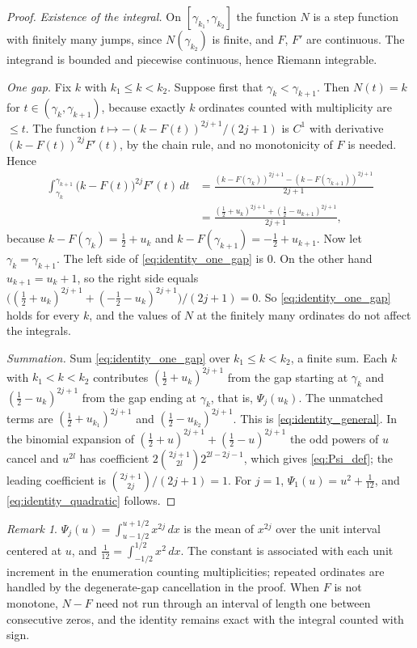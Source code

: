 \documentclass[11pt,a4paper]{article}
\makeatletter
\numberwithin{equation}{section}
\DeclareRobustCommand{\CGeqref}[1]{\eqref{#1}}
\let\CG@origeqref\eqref
\newcommand{\CG@gettip}[1]{\@ifundefined{CGTip@#1}{#1}{\csname CGTip@#1\endcsname}}
\DeclareRobustCommand{\CGeqref}[1]{\pdftooltip{\CG@origeqref{#1}}{\CG@gettip{#1}}}
\theoremstyle{definition}
\theoremstyle{remark}
\newtheorem{remark}[theorem]{Remark}
\makeatother
\begin{document}
\begin{proof}
\emph{Existence of the integral.} On $[\gamma_{k_1},\gamma_{k_2}]$ the function $N$ is a step function with finitely many jumps, since $N(\gamma_{k_2})$ is finite, and $F$, $F'$ are continuous. The integrand is bounded and piecewise continuous, hence Riemann integrable.

\emph{One gap.} Fix $k$ with $k_1\le k<k_2$. Suppose first that $\gamma_k<\gamma_{k+1}$. Then $N(t)=k$ for $t\in(\gamma_k,\gamma_{k+1})$, because exactly $k$ ordinates counted with multiplicity are $\le t$. The function $t\mapsto-(k-F(t))^{2j+1}/(2j+1)$ is $C^1$ with derivative $(k-F(t))^{2j}F'(t)$, by the chain rule, and no monotonicity of $F$ is needed. Hence
\begin{equation}
\begin{split}
\int_{\gamma_k}^{\gamma_{k+1}}\bigl(k-F(t)\bigr)^{2j}F'(t)\,dt&=\frac{(k-F(\gamma_k))^{2j+1}-(k-F(\gamma_{k+1}))^{2j+1}}{2j+1}\\
&=\frac{(\frac12+u_k)^{2j+1}+(\frac12-u_{k+1})^{2j+1}}{2j+1},
\end{split}
\label{eq:identity_one_gap}
\end{equation}
because $k-F(\gamma_k)=\frac12+u_k$ and $k-F(\gamma_{k+1})=-\frac12+u_{k+1}$. Now let $\gamma_k=\gamma_{k+1}$. The left side of \CGeqref{eq:identity_one_gap} is $0$. On the other hand $u_{k+1}=u_k+1$, so the right side equals $\bigl((\frac12+u_k)^{2j+1}+(-\frac12-u_k)^{2j+1}\bigr)/(2j+1)=0$. So \CGeqref{eq:identity_one_gap} holds for every $k$, and the values of $N$ at the finitely many ordinates do not affect the integrals.

\emph{Summation.} Sum \CGeqref{eq:identity_one_gap} over $k_1\le k<k_2$, a finite sum. Each $k$ with $k_1<k<k_2$ contributes $(\frac12+u_k)^{2j+1}$ from the gap starting at $\gamma_k$ and $(\frac12-u_k)^{2j+1}$ from the gap ending at $\gamma_k$, that is, $\Psi_j(u_k)$. The unmatched terms are $(\frac12+u_{k_1})^{2j+1}$ and $(\frac12-u_{k_2})^{2j+1}$. This is \CGeqref{eq:identity_general}. In the binomial expansion of $(\frac12+u)^{2j+1}+(\frac12-u)^{2j+1}$ the odd powers of $u$ cancel and $u^{2l}$ has coefficient $2\binom{2j+1}{2l}2^{2l-2j-1}$, which gives \CGeqref{eq:Psi_def}; the leading coefficient is $\binom{2j+1}{2j}/(2j+1)=1$. For $j=1$, $\Psi_1(u)=u^2+\frac1{12}$, and \CGeqref{eq:identity_quadratic} follows.
\end{proof}

\begin{remark}\label{rem:twelfth}
$\Psi_j(u)=\int_{u-1/2}^{u+1/2}x^{2j}\,dx$ is the mean of $x^{2j}$ over the unit interval centered at $u$, and $\frac1{12}=\int_{-1/2}^{1/2}x^2\,dx$. The constant is associated with each unit increment in the enumeration counting multiplicities; repeated ordinates are handled by the degenerate-gap cancellation in the proof. When $F$ is not monotone, $N-F$ need not run through an interval of length one between consecutive zeros, and the identity remains exact with the integral counted with sign.
\end{remark}
\end{document}
